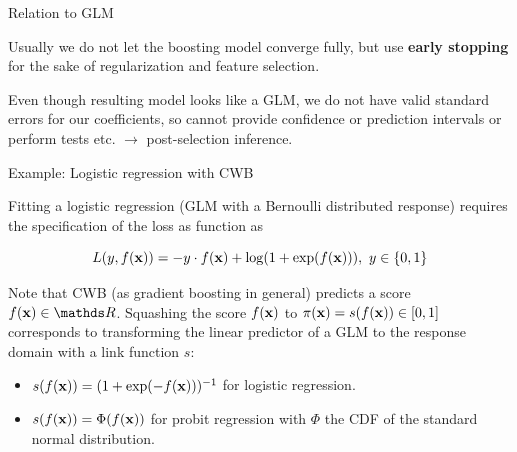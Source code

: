 \documentclass[11pt,compress,t,notes=noshow, xcolor=table]{beamer}
\begin{document}
\begin{vbframe}{Relation to GLM}
\lz

Usually we do not let the boosting model converge fully, but use \textbf{early stopping} for the sake of regularization and feature selection.

\lz

Even though resulting model looks like a GLM, we do not have valid standard
errors for our coefficients,
so cannot provide confidence or prediction intervals or perform tests etc.
$\rightarrow$ post-selection inference.

\end{vbframe}


\begin{vbframe}{Example: Logistic regression with CWB}

Fitting a logistic regression (GLM with a Bernoulli distributed response) requires the specification of the loss as function as

$$
  L(y, f(\mathbf{x})) = -y \cdot f(\mathbf{x}) + \log (1 + \exp(f(\mathbf{x}))),\ y\in\{0, 1\}
$$

Note that CWB (as gradient boosting in general) predicts a score $\fx \in \R$. Squashing the score $f(\mathbf{x})$ to $\pi(\mathbf{x}) = s(f(\mathbf{x})) \in [0,1]$ corresponds to transforming the linear predictor of a GLM to the response domain with a link function $s$:

\begin{itemize}
  \item $s(f(\mathbf{x})) = (1 + \exp(-f(\mathbf{x})))^{-1}$ for logistic regression.
  \item $s(f(\mathbf{x})) = \Phi(f(\mathbf{x}))$ for probit regression with $\Phi$ the CDF of the standard normal distribution.
\end{itemize}

\end{vbframe}


\end{document}
